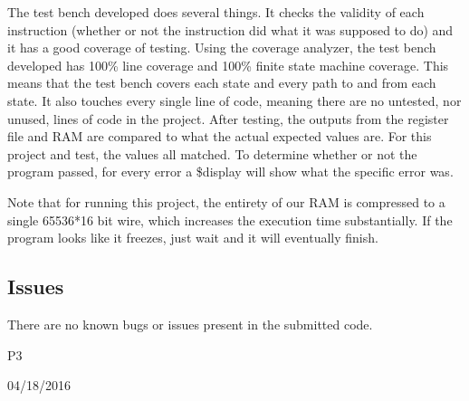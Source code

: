 \documentclass[conference]{IEEEtran}
\begin{document}
The test bench developed does several things. 
It checks the validity of each instruction (whether or not the instruction did what it was supposed to do) and it has a good coverage of testing. 
Using the coverage analyzer, the test bench developed has 100\% line coverage and 100\% finite state machine coverage. 
This means that the test bench covers each state and every path to and from each state. 
It also touches every single line of code, meaning there are no untested, nor unused, lines of code in the project.
After testing, the outputs from the register file and RAM are compared to what the actual expected values are.
For this project and test, the values all matched.
To determine whether or not the program passed, for every error a \$display will show what the specific error was.

Note that for running this project, the entirety of our RAM is compressed to a single 65536*16 bit wire, which increases the execution time substantially.
If the program looks like it freezes, just wait and it will eventually finish.


\subsection{Issues}
There are no known bugs or issues present in the submitted code.

\hfill P3
 
\hfill 04/18/2016
\end{document}
